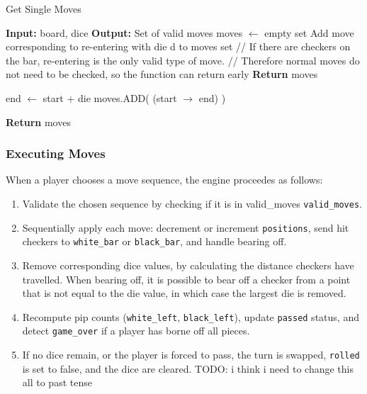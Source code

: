 \begin{algorithm}
    \label{fig:singleMoves}
    \caption{Get Single Moves}
    \begin{algorithmic}
    \State \textbf{Input:} board, dice
    \State \textbf{Output:} Set of valid moves
    \State
    \State moves $\gets$ empty set 
    \State
                \State Add move corresponding to re-entering with die d to moves set
            \EndIf
        \EndFor
        \State // If there are checkers on the bar, re-entering is the only valid type of move. 
        \State // Therefore normal moves do not need to be checked, so the function can return early
        \State \textbf{Return} moves
    \EndIf
    
    \State
    \State {} 
            \State end $\gets$ start + die 
                \State moves.ADD( (start $\to$ end) ) 
            \EndIf
        \EndFor
    \EndFor

    \State \textbf{Return} moves 
    \end{algorithmic}
\end{algorithm}

\subsubsection{Executing Moves}
When a player chooses a move sequence, the engine proceedes as follows:
\begin{enumerate}
\item Validate the chosen sequence by checking if it is in valid\_moves \texttt{valid\_moves}.
\item Sequentially apply each move: decrement or increment \texttt{positions}, send hit checkers to \texttt{white\_bar} or \texttt{black\_bar}, and handle bearing off.
\item Remove corresponding dice values, by calculating the distance checkers have travelled. When bearing off, it is possible to bear off a checker from a point that is not equal to the die value, in which case the largest die is removed.
\item Recompute pip counts (\texttt{white\_left}, \texttt{black\_left}), update \texttt{passed} status, and detect \texttt{game\_over} if a player has borne off all pieces.
\item If no dice remain, or the player is forced to pass, the turn is swapped, \texttt{rolled} is set to false, and the dice are cleared. TODO: i think i need to change this all to past tense
\end{enumerate}


